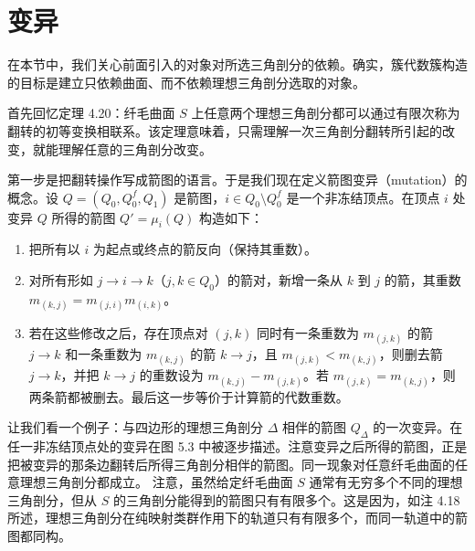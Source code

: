 \section{变异}

在本节中，我们关心前面引入的对象对所选三角剖分的依赖。确实，簇代数簇构造的目标是建立只依赖曲面、而不依赖理想三角剖分选取的对象。

首先回忆定理 4.20：纤毛曲面 $S$ 上任意两个理想三角剖分都可以通过有限次称为翻转的初等变换相联系。该定理意味着，只需理解一次三角剖分翻转所引起的改变，就能理解任意的三角剖分改变。

第一步是把翻转操作写成箭图的语言。于是我们现在定义箭图变异（mutation）的概念。设 $Q=(Q_0,Q_0^f,Q_1)$ 是箭图，$i\in Q_0\setminus Q_0^f$ 是一个非冻结顶点。在顶点 $i$ 处变异 $Q$ 所得的箭图 $Q'=\mu_i(Q)$ 构造如下：
\begin{enumerate}
\item 把所有以 $i$ 为起点或终点的箭反向（保持其重数）。
\item 对所有形如 $j\to i\to k$（$j,k\in Q_0$）的箭对，新增一条从 $k$ 到 $j$ 的箭，其重数 $m_{(k,j)}=m_{(j,i)}m_{(i,k)}$。
\item 若在这些修改之后，存在顶点对 $(j,k)$ 同时有一条重数为 $m_{(j,k)}$ 的箭 $j\to k$ 和一条重数为 $m_{(k,j)}$ 的箭 $k\to j$，且 $m_{(j,k)}<m_{(k,j)}$，则删去箭 $j\to k$，并把 $k\to j$ 的重数设为 $m_{(k,j)}-m_{(j,k)}$。若 $m_{(j,k)}=m_{(k,j)}$，则两条箭都被删去。最后这一步等价于计算箭的代数重数。
\end{enumerate}

\begin{example}[5.7]
让我们看一个例子：与四边形的理想三角剖分 $\Delta$ 相伴的箭图 $Q_\Delta$ 的一次变异。在任一非冻结顶点处的变异在图 5.3 中被逐步描述。注意变异之后所得的箭图，正是把被变异的那条边翻转后所得三角剖分相伴的箭图。同一现象对任意纤毛曲面的任意理想三角剖分都成立。
注意，虽然给定纤毛曲面 $S$ 通常有无穷多个不同的理想三角剖分，但从 $S$ 的三角剖分能得到的箭图只有有限多个。这是因为，如注 4.18 所述，理想三角剖分在纯映射类群作用下的轨道只有有限多个，而同一轨道中的箭图都同构。
\end{example}


